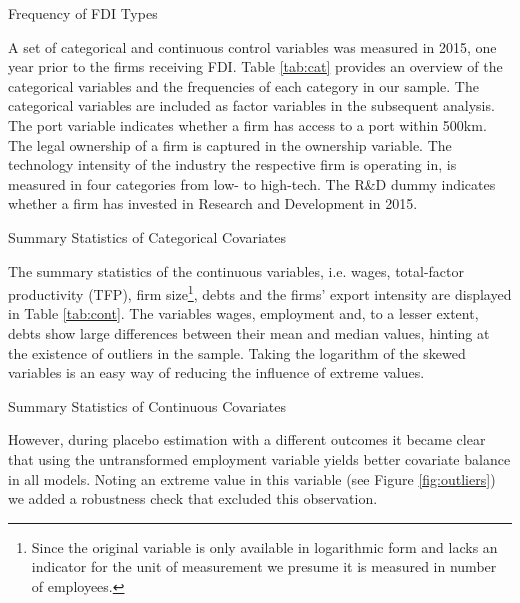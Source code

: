 \documentclass[a4paper,11pt]{scrartcl}
\begin{document}
\begin{table}[h!]
	\centering
	\caption{Frequency of FDI Types} 
	
\label{tab:freq}
\end{table}

A set of categorical and continuous control variables was measured in 2015, one year prior to the firms receiving FDI. Table \ref{tab:cat} provides an overview of the categorical variables and the frequencies of each category in our sample. The categorical variables are included as factor variables in the subsequent analysis. The port variable indicates whether a firm has access to a port within 500km. The legal ownership of a firm is captured in the ownership variable. The technology intensity of the industry the respective firm is operating in, is measured in four categories from low- to high-tech. The R\&D dummy indicates whether a firm has invested in Research and Development in 2015. \\

\begin{table}[h!]
	\centering
	\caption{Summary Statistics of Categorical Covariates} 
	
	\label{tab:cat}	
\end{table}

The summary statistics of the continuous variables, i.e. wages,  total-factor productivity (TFP), firm size\footnote{Since the original variable is only available in logarithmic form and lacks an indicator for the unit of measurement we presume it is measured in number of employees.}, debts and the firms' export intensity are displayed in Table \ref{tab:cont}. The variables wages, employment and, to a lesser extent, debts show large differences between their mean and median values, hinting at the existence of outliers in the sample. Taking the logarithm of the skewed variables is an easy way of reducing the influence of extreme values. 

\begin{table}[h!]
	\centering
	\caption{Summary Statistics of Continuous Covariates} 
	
	\label{tab:cont}
\end{table}

However, during placebo estimation with a different outcomes it became clear that using the untransformed employment variable yields better covariate balance in all models. Noting an extreme value in this variable (see Figure \ref{fig:outliers}) we added a robustness check that excluded this observation. 
\end{document}
